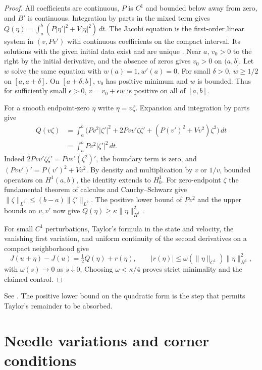 \documentclass[11pt,oneside,openany]{book}
\theoremstyle{plain}
\theoremstyle{definition}
\theoremstyle{remark}
\begin{document}
\begin{proof}
All coefficients are continuous, \(P\) is \(C^1\) and
bounded below away from zero, and \(B'\) is continuous.
Integration by parts in the mixed term gives
\(Q(\eta)=\int_a^b(P|\eta'|^2+V|\eta|^2)\,dt\).
The Jacobi equation is the first-order linear system in
\((v,Pv')\) with continuous coefficients on the compact interval.
Its solutions with the given initial data exist and are unique
\cite[Chapter 7]{MathGenomeD13}.
Near \(a\), \(v_0>0\) to the right by the initial derivative,
and the absence of zeros gives \(v_0>0\) on \((a,b]\).
Let \(w\) solve the same equation with \(w(a)=1,w'(a)=0\).
For small \(\delta>0\), \(w\ge1/2\) on \([a,a+\delta]\).
On \([a+\delta,b]\), \(v_0\) has positive minimum and \(w\)
is bounded. Thus for sufficiently small \(\epsilon>0\),
\(v=v_0+\epsilon w\) is positive on all of \([a,b]\).

For a smooth endpoint-zero \(\eta\) write \(\eta=v\zeta\).
Expansion and integration by parts give
\[
 \begin{aligned}
 Q(v\zeta)
 &=\int_a^b\bigl(Pv^2|\zeta'|^2
       +2Pvv'\zeta\zeta'+(P(v')^2+Vv^2)\zeta^2\bigr)\,dt\\
 &=\int_a^b Pv^2|\zeta'|^2\,dt.
 \end{aligned}
\]
Indeed \(2Pvv'\zeta\zeta' = Pvv'(\zeta^2)'\), the boundary term
is zero, and \((Pvv')'=P(v')^2+Vv^2\).
By density and multiplication by \(v\) or \(1/v\), bounded
operators on \(H^1(a,b)\), the identity extends to \(H^1_0\).
For zero-endpoint \(\zeta\) the fundamental theorem of calculus
and Cauchy--Schwarz give
\(\|\zeta\|_{L^2}\le(b-a)\|\zeta'\|_{L^2}\).
The positive lower bound of \(Pv^2\) and the upper bounds on
\(v,v'\) now give \(Q(\eta)\ge\kappa\|\eta\|_{H^1}^2\).

For small \(C^1\) perturbations, Taylor's formula in the state
and velocity, the vanishing first variation, and uniform
continuity of the second derivatives on a compact neighborhood
give
\[
 J(u+\eta)-J(u)=\tfrac12 Q(\eta)+r(\eta),\qquad
 |r(\eta)|\le \omega(\|\eta\|_{C^1})\|\eta\|_{H^1}^2,
\]
with \(\omega(s)\to0\) as \(s\downarrow0\).
Choosing \(\omega<\kappa/4\) proves strict minimality and the
claimed control.
\end{proof}

See \cite[Section 2.6.2]{Liberzon}. The positive lower bound on
the quadratic form is the step that permits Taylor's remainder
to be absorbed.

\section{Needle variations and corner conditions}
\label{v07-07}
\end{document}
